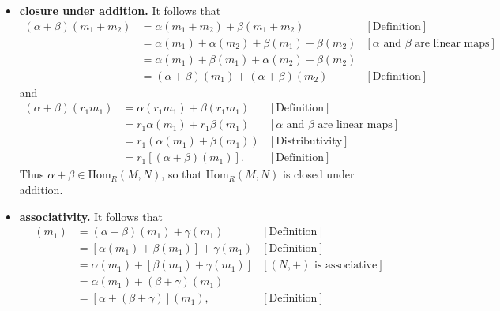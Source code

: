 \documentclass[9pt]{article}
\begin{document}
\begin{enumerate}
      \begin{itemize}
         \item \textbf{closure under addition.} It follows that
               \begin{align*}
                  (\alpha + \beta)(m_1 +m_2) &= \alpha(m_1+m_2) + \beta(m_1+m_2)
                     &[\text{Definition}] \\
                     &= \alpha(m_1) + \alpha(m_2) + \beta(m_1) + \beta(m_2)
                        &[\alpha \text{ and } \beta \text{ are linear maps}] \\
                     &= \alpha(m_1) + \beta(m_1) + \alpha(m_2) + \beta(m_2) \\
                     &= (\alpha+\beta)(m_1) + (\alpha+\beta)(m_2)
                        &[\text{Definition}] 
               \end{align*}
               and
               \begin{align*}
                  (\alpha + \beta)(r_1m_1) &= \alpha(r_1m_1) + \beta(r_1m_1)
                     &[\text{Definition}] \\
                     &= r_1\alpha(m_1) + r_1\beta(m_1)
                        &[\alpha \text{ and } \beta \text{ are linear maps}] \\
                     &= r_1(\alpha(m_1) + \beta(m_1)) &[\text{Distributivity}]\\
                     &= r_1[(\alpha+\beta)(m_1)]. &[\text{Definition}] 
               \end{align*}
               Thus $\alpha+\beta \in \text{Hom}_R(M, N)$, so that
               $\text{Hom}_R(M, N)$ is closed under addition.
         \item \textbf{associativity.} It follows that
               \begin{align*}
                  [(\alpha + \beta) + \gamma](m_1) &=
                     (\alpha+\beta)(m_1) + \gamma(m_1) &[\text{Definition}] \\
                     &= [\alpha(m_1) + \beta(m_1)] + \gamma(m_1)
                        &[\text{Definition}] \\
                     &= \alpha(m_1) + [\beta(m_1) + \gamma(m_1)]
                        &[(N, +) \text{ is associative}] \\
                     &= \alpha(m_1) + (\beta+\gamma)(m_1) \\
                     &= [\alpha + (\beta + \gamma)](m_1), &[\text{Definition}]
               \end{align*}

\end{itemize}
\end{enumerate}
\end{document}
